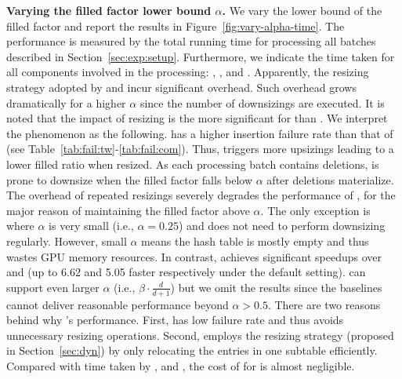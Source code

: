 \vspace{1mm}\noindent\textbf{Varying the filled factor lower bound $\alpha$.}
We vary the lower bound of the filled factor and report the results in Figure~\ref{fig:vary-alpha-time}. 
The performance is measured by the total running time for processing all batches described in Section~\ref{sec:exp:setup}. Furthermore, we indicate the time taken for all components involved in the processing: , ,  and . Apparently, the resizing strategy adopted by \linear and \megakv incur significant overhead. Such overhead grows dramatically for a higher $\alpha$ since the number of downsizings are executed. It is noted that the impact of resizing is the more significant for \megakv than \linear. We interpret the phenomenon as the following.
\megakv has a higher insertion failure rate than that of \linear (see Table~\ref{tab:fail:tw}-\ref{tab:fail:com}). Thus, \megakv triggers more upsizings leading to a lower filled ratio when resized. As each processing batch contains deletions, \megakv is prone to downsize when the filled factor falls below $\alpha$ after deletions materialize.
The overhead of repeated resizings severely degrades the performance of \megakv, for the major reason of maintaining the filled factor above $\alpha$. 
The only exception is where $\alpha$ is very small (i.e., $\alpha=0.25$) and \megakv does not need to perform downsizing regularly. However, small $\alpha$ means the hash table is mostly empty and thus wastes GPU memory resources.
In contrast, \voter achieves significant speedups over \linear and \megakv (up to 6.62 and 5.05 faster respectively under the default setting). 
\voter can support even larger $\alpha$ (i.e., $\beta\cdot\frac{d}{d+1}$) but we omit the results since the baselines cannot deliver reasonable performance beyond $\alpha > 0.5$.
There are two reasons behind why \voter's performance. First, \voter has low failure rate and thus avoids unnecessary resizing operations. Second, \voter employs the resizing strategy (proposed in Section~\ref{sec:dyn}) by only relocating the entries in one subtable efficiently. 
Compared with time taken by ,  and , the cost of  for \voter is almost negligible.




